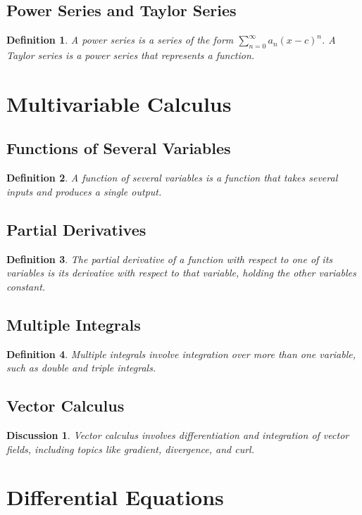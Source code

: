 \documentclass[a4paper,12pt]{book}
\newtheorem{definition}{Definition}
\newtheorem{discussion}{Discussion}
\begin{document}
\subsection{Power Series and Taylor Series}
\begin{definition}
A power series is a series of the form \( \sum_{n=0}^\infty a_n (x - c)^n \). A Taylor series is a power series that represents a function.
\end{definition}

\section{Multivariable Calculus}
\subsection{Functions of Several Variables}
\begin{definition}
A function of several variables is a function that takes several inputs and produces a single output.
\end{definition}

\subsection{Partial Derivatives}
\begin{definition}
The partial derivative of a function with respect to one of its variables is its derivative with respect to that variable, holding the other variables constant.
\end{definition}

\subsection{Multiple Integrals}
\begin{definition}
Multiple integrals involve integration over more than one variable, such as double and triple integrals.
\end{definition}

\subsection{Vector Calculus}
\begin{discussion}
Vector calculus involves differentiation and integration of vector fields, including topics like gradient, divergence, and curl.
\end{discussion}

\section{Differential Equations}
\end{document}
